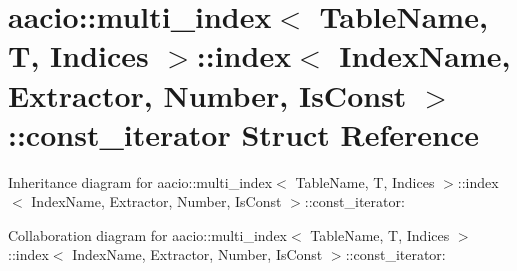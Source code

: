 \hypertarget{structaacio_1_1multi__index_1_1index_1_1const__iterator}{}\section{aacio\+:\+:multi\+\_\+index$<$ Table\+Name, T, Indices $>$\+:\+:index$<$ Index\+Name, Extractor, Number, Is\+Const $>$\+:\+:const\+\_\+iterator Struct Reference}
\label{structaacio_1_1multi__index_1_1index_1_1const__iterator}


Inheritance diagram for aacio\+:\+:multi\+\_\+index$<$ Table\+Name, T, Indices $>$\+:\+:index$<$ Index\+Name, Extractor, Number, Is\+Const $>$\+:\+:const\+\_\+iterator\+:


Collaboration diagram for aacio\+:\+:multi\+\_\+index$<$ Table\+Name, T, Indices $>$\+:\+:index$<$ Index\+Name, Extractor, Number, Is\+Const $>$\+:\+:const\+\_\+iterator\+:
